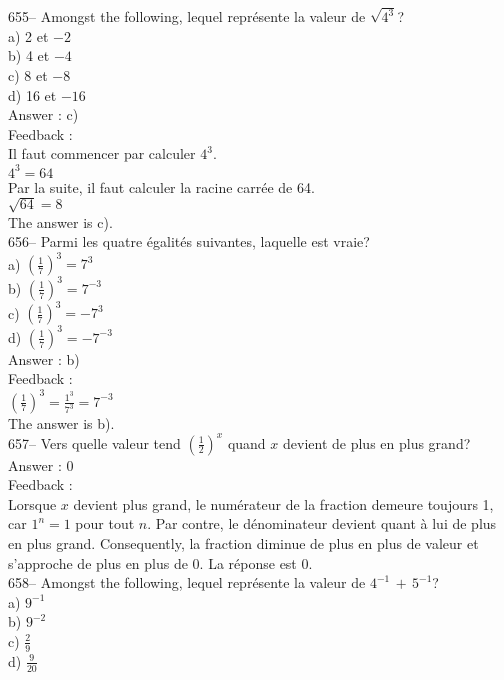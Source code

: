 ﻿\documentclass[letterpaper, 12pt]{article}
\begin{document}
655-- Amongst the following, lequel repr\'esente la valeur de
$\sqrt{4^{3}}$?\\
a) 2 et $-2$\\
b) 4 et $-4$\\
c) 8 et $-8$\\
d) 16 et $-16$\\

Answer : c)\\

Feedback : \\
Il faut commencer par calculer $4^{3}$.\\
$4^{3}=64$\\
Par la suite, il faut calculer la racine carr\'ee de 64.\\
$\sqrt{64}= 8$\\
The answer is c).\\

656-- Parmi les quatre \'egalit\'es suivantes, laquelle est vraie?\\
a) $(\frac{1}{7})^{3}=7^{3}$\\[2mm]
b) $(\frac{1}{7})^{3}=7^{-3}$\\[2mm]
c) $(\frac{1}{7})^{3}=-7^{3}$\\[2mm]
d) $(\frac{1}{7})^{3}=-7^{-3}$\\

Answer : b)\\

Feedback : \\[2mm]
$(\frac{1}{7})^{3}=\frac{1^{3}}{7^{3}}=7^{-3}$\\[2mm]
The answer is b).\\

657-- Vers quelle valeur tend $\left(\frac12\right)^x$ quand $x$
devient de plus
en plus grand?\\

Answer : 0\\

Feedback : \\
Lorsque $x$ devient plus grand, le num\'erateur de la fraction demeure
toujours 1, car $1^{n}=1$ pour tout $n$.  Par contre, le d\'enominateur
devient quant \`a lui de plus en plus grand.  Consequently, la fraction
diminue de plus en plus de valeur et s'approche de plus en plus de 0.  La
r\'eponse est 0.  \\

658-- Amongst the following, lequel repr\'esente la valeur de
$4^{-1}\,+\,5^{-1}$?\\
a) $9^{-1}$\\[2mm]
b) $9^{-2}$\\[2mm]
c) $\frac{2}{9}$\\[2mm]
d) $\frac{9}{20}$\\
\end{document}
